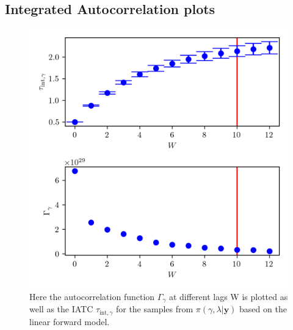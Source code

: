\subsection{Integrated Autocorrelation plots} 
\begin{figure}[ht!]
	\centering
	\includegraphics{UwerrTauIntFirstO3gam.png}
	\caption[IATC of $\gamma$ samples from $\pi(\gamma, \lambda| \bm{y})$, for linear model.]{Here the autocorrelation function $\Gamma_{\gamma}$ at different lags W is plotted as well as the IATC $\tau_{\text{int},\gamma}$ for the samples from $\pi(\gamma, \lambda| \bm{y})$ based on the linear forward model.}
	\label{fig:IATCGamLin}
\end{figure}
